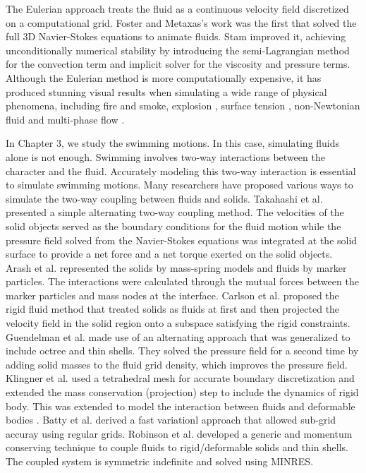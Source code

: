 The Eulerian approach treats the fluid as a continuous velocity field discretized
on a computational grid. Foster and Metaxas's work \cite{} was the first that
solved the full 3D Navier-Stokes equations to animate fluids.
Stam \cite{} improved it, achieving unconditionally
numerical stability by introducing the semi-Lagrangian
method for the convection term and implicit solver for
the viscosity and pressure terms. Although the Eulerian method is more computationally expensive, it has produced stunning visual results when simulating a wide range of physical phenomena, including fire and smoke\cite{}, explosion \cite{}, surface tension \cite{}, non-Newtonian fluid \cite{} and multi-phase flow \cite{}.

In Chapter 3, we study the swimming motions. In this case, simulating fluids alone is not enough. Swimming involves two-way interactions between the character and the fluid. Accurately modeling this two-way interaction is essential to simulate swimming motions. Many researchers have proposed various ways to
simulate the two-way coupling between fluids and solids.  Takahashi et al. \cite{takahashi2002fluid-rigid}
presented a simple alternating two-way coupling method. The velocities of the solid
objects served as the boundary conditions for the fluid motion while the
pressure field solved from the Navier-Stokes equations was integrated at the
solid surface to provide a net force and a net torque exerted on the solid
objects. Arash et al. \cite{arash2003simulatingfluid-solid} represented the solids by mass-spring models and fluids by marker particles.  The interactions were calculated through the mutual forces between the marker particles and mass nodes at the interface. Carlson et al. \cite{carlson2004rigid} proposed the rigid
fluid method that treated solids as fluids at first
and then projected the velocity field in the solid region onto a subspace
satisfying the rigid constraints. Guendelman et al. \cite{guendelman2005thin} made use of an
alternating approach that was generalized to include octree and thin
shells.  They solved the pressure field for a
second time by adding solid masses to the fluid grid density, which improves
the pressure field. Klingner et al. \cite{klingner2006mesh} used a tetrahedral mesh for accurate boundary discretization and extended the mass conservation (projection) step
to include the dynamics of rigid body. This was extended to model the interaction between fluids and deformable bodies \cite{chentanez2006simultaneous}. Batty et al. \cite{batty2007fast} derived a fast variationl approach that allowed sub-grid accuray using regular grids. Robinson et al. \cite{robinson2008two} developed a generic and momentum
conserving technique to couple fluids to rigid/deformable solids and thin
shells. The coupled system is symmetric indefinite and solved using MINRES.

